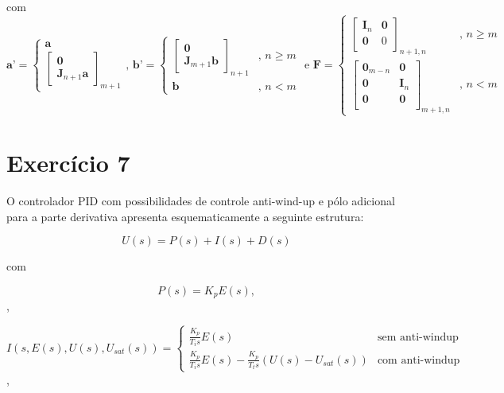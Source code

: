 \documentclass[twoside, fleqn]{article}
\begin{document}
    com $\textbf{a'} = \begin{cases} \textbf{a}\\ \begin{bmatrix} \textbf{0} \\ \textbf{J}_{n+1} \textbf{a} \end{bmatrix}_{m+1} \end{cases} \mbox{, } \textbf{b'} = \begin{cases} \begin{bmatrix} \textbf{0}\\ \textbf{J}_{m+1} \textbf{b} \end{bmatrix}_{n+1} &\mbox{, } n \geq m \\ \textbf{b} &\mbox{, } n < m \end{cases} \mbox{ e } \textbf{F} = \begin{cases}\begin{bmatrix} \textbf{I}_{n} & \textbf{0} \\ \textbf{0} & 0 \\ \end{bmatrix}_{n+1, n} &\mbox{, } n \geq m \\ \begin{bmatrix} \textbf{0}_{m-n} & \textbf{0} \\ \textbf{0} & \textbf{I}_{n} \\ \textbf{0} & \textbf{0} \\ \end{bmatrix}_{m+1, n} & \mbox{, } n < m \end{cases}$

\section*{Exercício 7}

    O controlador PID com possibilidades de controle anti-wind-up e pólo adicional para a parte derivativa apresenta esquematicamente a seguinte estrutura:
    
        \begin{equation}
            U(s) = P(s) + I(s) + D(s)
            \label{eq:PID}
        \end{equation}
    
    com 
    
        \begin{equation}
            P(s) = K_p E(s),
            \label{eq:P}
        \end{equation},
    
        \begin{equation}
            I(s, E(s), U(s), U_{sat}(s)) = \begin{cases}
            \frac{K_p}{T_i s} E(s) & \mbox{sem anti-windup} \\
            \frac{K_p}{T_i s} E(s) - \frac{K_p}{T_t s} \left(U(s) - U_{sat}(s)\right)& \mbox{com anti-windup}
            \end{cases}
            \label{eq:I}
        \end{equation},
    
\end{document}
